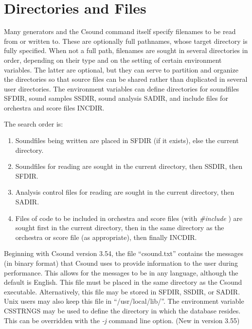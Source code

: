 \section{Directories and Files}


  Many generators and the Csound command itself specify filenames to be read from or written to. These are optionally full pathnames, whose target directory is fully specified. When not a full path, filenames are sought in several directories in order, depending on their type and on the setting of certain environment variables. The latter are optional, but they can serve to partition and organize the directories so that source files can be shared rather than duplicated in several user directories. The environment variables can define directories for soundfiles SFDIR, sound samples SSDIR, sound analysis SADIR, and include files for orchestra and score files INCDIR. 


  The search order is: 


 
\begin{enumerate}
\item 

 Soundfiles being written are placed in SFDIR (if it exists), else the current directory.

\item 

 Soundfiles for reading are sought in the current directory, then SSDIR, then SFDIR.

\item 

 Analysis control files for reading are sought in the current directory, then SADIR.

\item 

  Files of code to be included in orchestra and score files (with \emph{\#include}
) are sought first in the current directory, then in the same directory as the orchestra or score file (as appropriate), then finally INCDIR. 


\end{enumerate}


  Beginning with Csound version 3.54, the file ``csound.txt'' contains the messages (in binary format) that Csound uses to provide information to the user during performance. This allows for the messages to be in any language, although the default is English. This file must be placed in the same directory as the Csound executable. Alternatively, this file may be stored in SFDIR, SSDIR, or SADIR. Unix users may also keep this file in ``/usr/local/lib/''. The environment variable CSSTRNGS may be used to define the directory in which the database resides. This can be overridden with the \emph{-j}
 command line option. (New in version 3.55) 


\begin{comment}
\begin{tabular}{lcr}
Previous &Home &Next \\
Score File Preprocessing &Up &Nomenclature

\end{tabular}



\end{comment}
